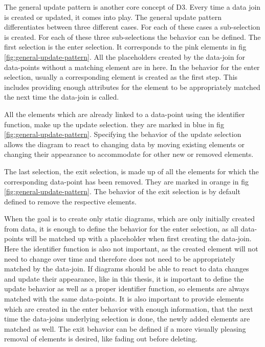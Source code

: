 The general update pattern is another core concept of D3. Every time a data join is created or updated, it comes into play. The general update pattern differentiates between three different cases. For each of these cases a sub-selection is created. For each of these three sub-selections the behavior can be defined. The first selection is the enter selection. It corresponds to the pink elements in fig \ref{fig:general-update-pattern}. All the placeholders created by the data-join for data-points without a matching element are in here. In the behavior for the enter selection, usually a corresponding element is created as the first step. This includes providing enough attributes for the element to be appropriately matched the next time the data-join is called.

All the elements which are already linked to a data-point using the identifier function, make up the update selection. they are marked in blue in fig \ref{fig:general-update-pattern}. Specifying the behavior of the update selection allows the diagram to react to changing data by moving existing elements or changing their appearance to accommodate for other new or removed elements.

The last selection, the exit selection, is made up of all the elements for which the corresponding data-point has been removed. They are marked in orange in fig \ref{fig:general-update-pattern}. The behavior of the exit selection is by default defined to remove the respective elements.

When the goal is to create only static diagrams, which are only initially created from data, it is enough to define the behavior for the enter selection, as all data-points will be matched up with a placeholder when first creating the data-join. Here the identifier function is also not important, as the created element will not need to change over time and therefore does not need to be appropriately matched by the data-join. If diagrams should be able to react to data changes and update their appearance, like in this thesis, it is important to define the update behavior as well as a proper identifier function, so elements are always matched with the same data-points. It is also important to provide elements which are created in the enter behavior with enough information, that the next time the data-joins underlying selection is done, the newly added elements are matched as well. The exit behavior can be defined if a more visually pleasing removal of elements is desired, like fading out before deleting.


